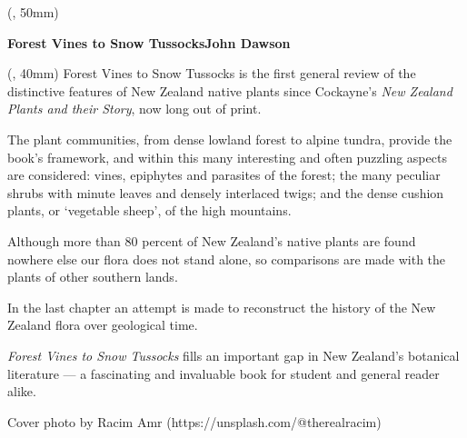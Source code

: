 	\begin{textblock*}{1pt} (\spineoffset-7pt, 50mm)
		\centering%
		\begin{rotate}{-90}
			\fontsize{18}{18}\selectfont%
			\textbf{Forest Vines to Snow Tussocks\hspace{11em}John Dawson}
		\end{rotate}
	\end{textblock*}

	\begin{textblock*}{\blurbwidth} (\blurboffset, 40mm)
		\Large\centering%
		\setlength{\parskip}{1em}%
		Forest Vines to Snow Tussocks is the first general review of the distinctive features of New Zealand native plants since Cockayne's \emph{New Zealand Plants and their Story}, now long out of print.

		The plant communities, from dense lowland forest to alpine tundra, provide the book's framework, and within this many interesting and often puzzling aspects are considered: vines, epiphytes and parasites of the forest; the many peculiar shrubs with minute leaves and densely interlaced twigs; and the dense cushion plants, or `vegetable sheep', of the high mountains.

		Although more than 80 percent of New Zealand's native plants are found nowhere else our flora does not stand alone, so comparisons are made with the plants of other southern lands.

		In the last chapter an attempt is made to reconstruct the history of the New Zealand flora over geological time.

		\emph{Forest Vines to Snow Tussocks} fills an important gap in New Zealand's botanical literature — a fascinating and invaluable book for student and general reader alike.
		
		\vspace{5em}%
		{\small Cover photo by Racim Amr (https://unsplash.com/@therealracim)}
	\end{textblock*}

	\ISBNgraphic%


